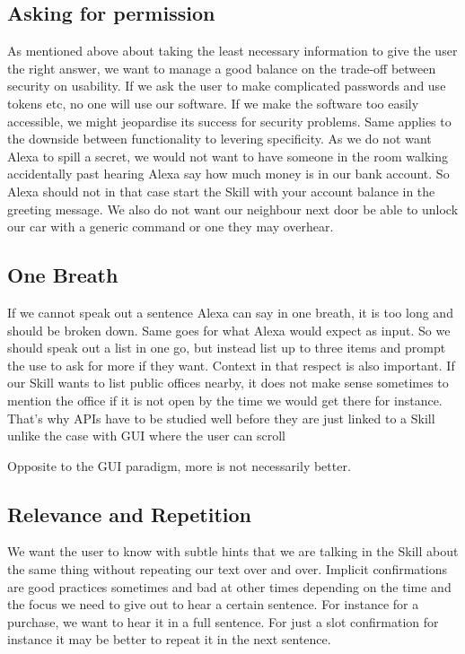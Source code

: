 \subsection*{Asking for permission}
As mentioned above about taking the least necessary information to give the user the right answer, we want to manage a good balance on the trade-off between security on usability. If we ask the user to make complicated passwords and use tokens etc, no one will use our software. If we make the software too easily accessible, we might jeopardise its success for security problems. Same applies to the downside between functionality to levering specificity. As we do not want Alexa to spill a secret, we would not want to have someone in the room walking accidentally past hearing Alexa say how much money is in our bank account. So Alexa should not in that case start the Skill with your account balance in the greeting message. We also do not want our neighbour next door be able to unlock our car with a generic command or one they may overhear.

\subsection*{One Breath}
If we cannot speak out a sentence Alexa can say in one breath, it is too long and should be broken down. Same goes for what Alexa would expect as input. %
So we should speak out a list in one go, but instead list up to three items and prompt the use to ask for more if they want. Context in that respect is also important. If our Skill wants to list public offices nearby, it does not make sense sometimes to mention the office if it is not open by the time we would get there for instance. That's why APIs have to be studied well before they are just linked to a Skill unlike the case with GUI where the user can scroll

Opposite to the GUI paradigm, more is not necessarily better.

\subsection*{Relevance and Repetition}

We want the user to know with subtle hints that we are talking in the Skill about the same thing without repeating our text over and over. Implicit confirmations are good practices sometimes and bad at other times depending on the time and the focus we need to give out to hear a certain sentence. For instance for a purchase, we want to hear it in a full sentence. For just a slot confirmation for instance it may be better to repeat it in the next sentence.

